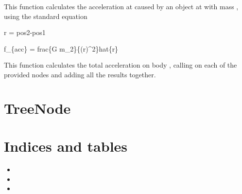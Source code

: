 \documentclass[letterpaper,10pt,english]{sphinxmanual}
\begin{document}
This function calculates the acceleration at  caused by an object at  with mass , using the standard equation

r = pos2-pos1

f\_\{acc\} = frac\{G m\_2\}\{(\textbar{}r\textbar{})\textasciicircum{}2\}hat\{r\}

\begin{fulllineitems}
\end{fulllineitems}


This function calculates the total acceleration on body , calling  on each of the provided nodes and adding all the results together.


\chapter{TreeNode}
\label{\detokenize{tree:treenode}}\label{\detokenize{tree::doc}}


\chapter{Indices and tables}
\label{\detokenize{index:indices-and-tables}}\begin{itemize}
\item {} 

\item {} 

\item {} 

\end{itemize}



\renewcommand{\indexname}{Index}
\printindex
\end{document}
